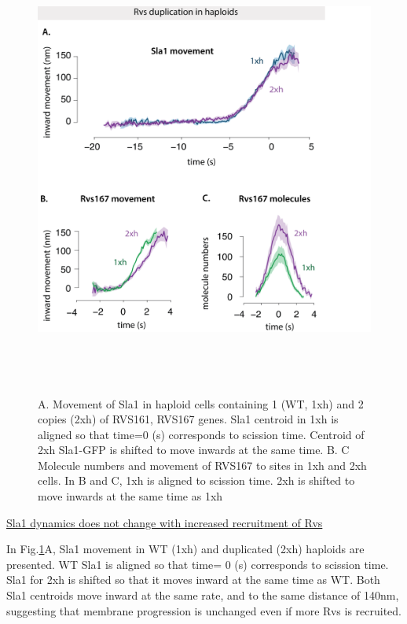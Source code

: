 				\begin{figure}[H]
	\centering
	\includegraphics[width=15cm,height=15cm,keepaspectratio]{figures/results_final/rvs_haploid4}
	\vspace*{2mm}
	\caption[Overexpression of Rvs in haploid cells]
	{A. Movement of Sla1 in haploid cells containing 1 (WT, 1xh) and 2 copies (2xh) of RVS161, RVS167 genes. Sla1 centroid in 1xh is aligned so that time=0 (s) corresponds to scission time. Centroid of 2xh Sla1-GFP is shifted to move inwards at the same time. 
		B. C Molecule numbers and movement of RVS167 to sites in 1xh and 2xh cells. In B and C, 1xh is aligned to scission time. 2xh is shifted to move inwards at the same time as 1xh
		\label{fig_rvshaploid}}
	
\end{figure}
 
 \underline{Sla1 dynamics does not change with increased recruitment of Rvs}
 
In Fig.\ref{fig_rvshaploid}A, Sla1 movement in WT (1xh) and duplicated (2xh) haploids are presented. WT Sla1 is aligned so that time= 0 (s) corresponds to scission time. Sla1 for 2xh is shifted so that it moves inward at the same time as WT. Both Sla1 centroids move inward at the same rate, and to the same distance of 140nm, suggesting that membrane progression is unchanged even if more Rvs is recruited. 


